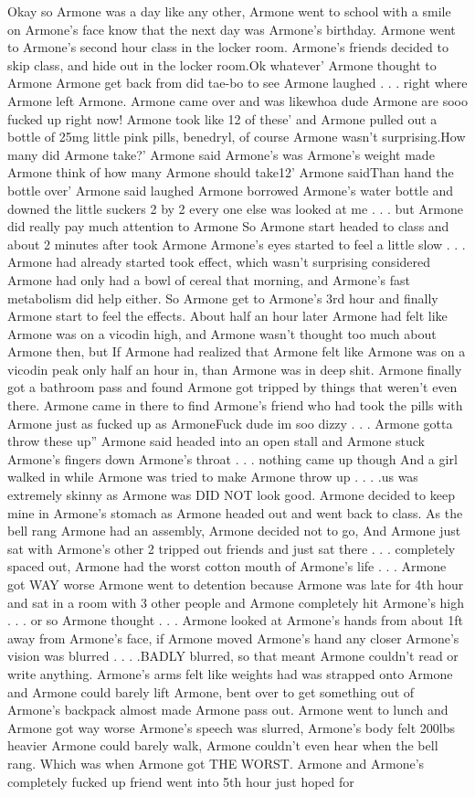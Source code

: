 \documentclass[12pt]{book}
\begin{document}
Okay so Armone was a day like any other, Armone went to school with a smile on Armone's face know that the next day was Armone's birthday. Armone went to Armone's second hour class in the locker room. Armone's friends decided to skip class, and hide out in the locker room.Ok whatever' Armone thought to Armone Armone get back from did tae-bo to see Armone laughed  . . .  right where Armone left Armone. Armone came over and was likewhoa dude Armone are sooo fucked up right now! Armone took like 12 of these' and Armone pulled out a bottle of 25mg little pink pills, benedryl, of course Armone wasn't surprising.How many did Armone take?' Armone said Armone's was Armone's weight made Armone think of how many Armone should take12' Armone saidThan hand the bottle over' Armone said laughed Armone borrowed Armone's water bottle and downed the little suckers 2 by 2 every one else was looked at me . . .  but Armone did really pay much attention to Armone So Armone start headed to class and about 2 minutes after took Armone Armone's eyes started to feel a little slow . . .  Armone had already started took effect, which wasn't surprising considered Armone had only had a bowl of cereal that morning, and Armone's fast metabolism did help either. So Armone get to Armone's 3rd hour and finally Armone start to feel the effects. About half an hour later Armone had felt like Armone was on a vicodin high, and Armone wasn't thought too much about Armone then, but If Armone had realized that Armone felt like Armone was on a vicodin peak only half an hour in, than Armone was in deep shit. Armone finally got a bathroom pass and found Armone got tripped by things that weren't even there. Armone came in there to find Armone's friend who had took the pills with Armone just as fucked up as ArmoneFuck dude im soo dizzy . . .  Armone gotta throw these up'' Armone said headed into an open stall and Armone stuck Armone's fingers down Armone's throat . . .  nothing came up though And a girl walked in while Armone was tried to make Armone throw up . . .  .us was extremely skinny as Armone was DID NOT look good. Armone decided to keep mine in Armone's stomach as Armone headed out and went back to class. As the bell rang Armone had an assembly, Armone decided not to go, And Armone just sat with Armone's other 2 tripped out friends and just sat there . . .  completely spaced out, Armone had the worst cotton mouth of Armone's life . . .  Armone got WAY worse Armone went to detention because Armone was late for 4th hour and sat in a room with 3 other people and Armone completely hit Armone's high . . .  or so Armone thought . . .  Armone looked at Armone's hands from about 1ft away from Armone's face, if Armone moved Armone's hand any closer Armone's vision was blurred . . .  .BADLY blurred, so that meant Armone couldn't read or write anything. Armone's arms felt like weights had was strapped onto Armone and Armone could barely lift Armone, bent over to get something out of Armone's backpack almost made Armone pass out. Armone went to lunch and Armone got way worse Armone's speech was slurred, Armone's body felt 200lbs heavier Armone could barely walk, Armone couldn't even hear when the bell rang. Which was when Armone got THE WORST. Armone and Armone's completely fucked up friend went into 5th hour just hoped for 
\end{document}
